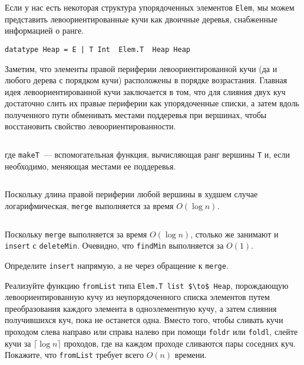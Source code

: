 \begin{frame}[fragile]
Если у нас есть некоторая структура упорядоченных элементов
\texttt{Elem}, 
мы можем представить левоориентированные кучи как
двоичные деревья, снабженные информацией о ранге.
\begin{verbatim}
datatype Heap = E | T Int  Elem.T  Heap Heap
\end{verbatim}

Заметим, что элементы правой периферии левоориентированной кучи (да и
любого дерева с порядком кучи) расположены в порядке возрастания.
Главная идея левоориентированной кучи заключается в том, что для
слияния двух куч достаточно слить их правые периферии как
упорядоченные списки, а затем вдоль полученного пути обменивать
местами поддеревья при вершинах, чтобы восстановить свойство
левоориентированности. 

\end{frame}

\begin{frame}[fragile]{}
\inputminted[firstline=23, lastline=26] {haskell}{code/Heap.hs}

где \lstinline!makeT!~--- вспомогательная функция, вычисляющая ранг
вершины \lstinline!T! и, если необходимо, меняющая местами ее
поддеревья.

\inputminted[firstline=30, lastline=35] {haskell}{code/Heap.hs}

Поскольку длина правой периферии любой вершины в худшем случае
логарифмическая, \lstinline!merge! выполняется за время $O(\log n)$.
\end{frame}

\begin{frame}[fragile]{}
\inputminted[firstline=36, lastline=38] {haskell}{code/Heap.hs}

Поскольку \lstinline!merge! выполняется за время $O(\log n)$, столько
же занимают и \lstinline!insert! с \lstinline!deleteMin!. Очевидно,
что \lstinline!findMin! выполняется за $O(1)$. 
\end{frame}

\begin{frame}[fragile]{}
\begin{exercise}\label{ex:3.2}
  Определите \lstinline!insert! напрямую, а не через обращение к \lstinline!merge!.
\end{exercise}

\begin{exercise}\label{ex:3.3}
  Реализуйте функцию \lstinline!fromList! типа \lstinline!Elem.T list $\to$ Heap!,
  порождающую левоориентированную кучу из неупорядоченного списка
  элементов путем преобразования каждого элемента в одноэлементную
  кучу, а затем слияния получившихся куч, пока не останется
  одна. Вместо того, чтобы сливать кучи проходом слева направо или
  справа налево при помощи \lstinline!foldr! или \lstinline!foldl!,
  слейте кучи за $\lceil \log n \rceil$ проходов, где на каждом
  проходе сливаются пары соседних куч. Покажите, что
  \lstinline!fromList! требует всего $O(n)$ времени.
\end{exercise}
\end{frame}

